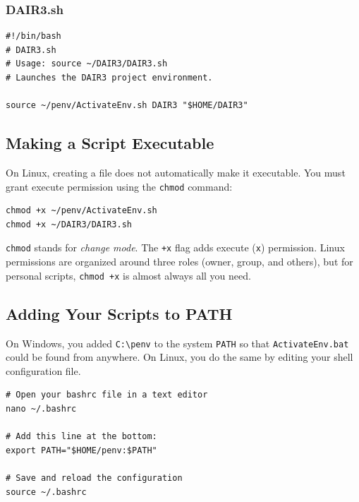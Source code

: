 \subsubsection{DAIR3.sh}

\begin{lstlisting}[style=linuxStyle, caption={\texttt{DAIR3.sh}: Project launcher (Linux/WSL)}]
#!/bin/bash
# DAIR3.sh
# Usage: source ~/DAIR3/DAIR3.sh
# Launches the DAIR3 project environment.

source ~/penv/ActivateEnv.sh DAIR3 "$HOME/DAIR3"
\end{lstlisting}

\subsection{Making a Script Executable}
\label{sec:chmod}

On Linux, creating a file does not automatically make it executable. You
must grant execute permission using the \texttt{chmod} command:

\begin{lstlisting}[style=linuxStyle]
chmod +x ~/penv/ActivateEnv.sh
chmod +x ~/DAIR3/DAIR3.sh
\end{lstlisting}

\texttt{chmod} stands for \emph{change mode}. The \texttt{+x} flag adds
execute (\texttt{x}) permission. Linux permissions are organized around
three roles (owner, group, and others), but for personal scripts,
\texttt{chmod +x} is almost always all you need.

\subsection{Adding Your Scripts to PATH}

On Windows, you added \texttt{C:\textbackslash penv} to the system
\texttt{PATH} so that \texttt{ActivateEnv.bat} could be found from
anywhere. On Linux, you do the same by editing your shell configuration
file.

\begin{lstlisting}[style=linuxStyle, caption={Adding \textasciitilde/penv to PATH in \textasciitilde/.bashrc}]
# Open your bashrc file in a text editor
nano ~/.bashrc

# Add this line at the bottom:
export PATH="$HOME/penv:$PATH"

# Save and reload the configuration
source ~/.bashrc
\end{lstlisting}

